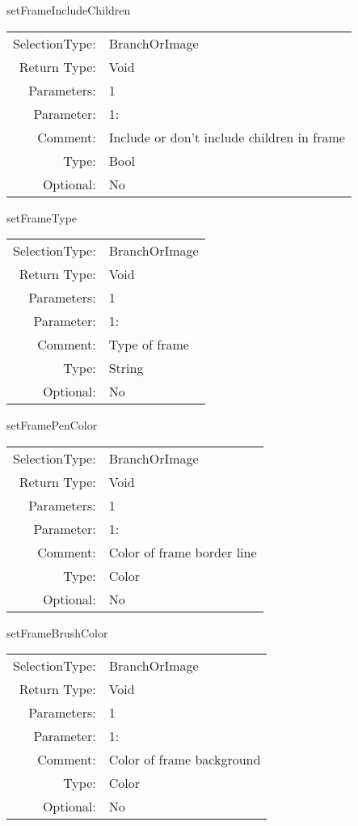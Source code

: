 \item setFrameIncludeChildren\\
\begin{tabular}{rl}
  SelectionType: & BranchOrImage\\
    Return Type: & Void\\
     Parameters: & 1\\
   Parameter: &  1:\\
        Comment: & Include or don't include children in frame\\
           Type: & Bool\\
       Optional: &  No\\
\end{tabular}

\item setFrameType\\
\begin{tabular}{rl}
  SelectionType: & BranchOrImage\\
    Return Type: & Void\\
     Parameters: & 1\\
   Parameter: &  1:\\
        Comment: & Type of frame\\
           Type: & String\\
       Optional: &  No\\
\end{tabular}

\item setFramePenColor\\
\begin{tabular}{rl}
  SelectionType: & BranchOrImage\\
    Return Type: & Void\\
     Parameters: & 1\\
   Parameter: &  1:\\
        Comment: & Color of frame border line\\
           Type: & Color\\
       Optional: &  No\\
\end{tabular}

\item setFrameBrushColor\\
\begin{tabular}{rl}
  SelectionType: & BranchOrImage\\
    Return Type: & Void\\
     Parameters: & 1\\
   Parameter: &  1:\\
        Comment: & Color of frame background\\
           Type: & Color\\
       Optional: &  No\\
\end{tabular}

